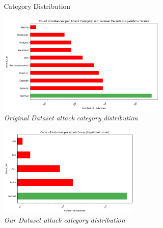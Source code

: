 \documentclass[12pt,aspectratio=169,notheorems]{beamer}
\begin{document}
\begin{frame}{Category Distribution}
\begin{center}
\begin{minipage}[t][6cm][t]{0.5\textwidth}
            \includegraphics[width=\textwidth, height=5cm, keepaspectratio]{attack_cat_before.png} \\
            \textit{Original Dataset \emph{attack category} distribution}
        \end{minipage} 
        \hfill
        \begin{minipage}[t]{0.45\textwidth}
            \centering
            \vspace{-0.01cm}
            \caption{Counts for each attack category.}
            \label{tab:inverted_attack_categories}
            \includegraphics[width=\textwidth, height=4.5cm, keepaspectratio]{attack_cat_after.png} \\
            \textit{Our Dataset \emph{attack category} distribution}
            
        \end{minipage}
        \hspace*{-1cm}
        
    \end{center}
\end{frame}
\end{document}
